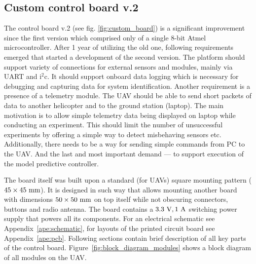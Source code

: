 \subsection{Custom control board v.2}

The control board v.2 (see fig. \ref{fig:custom_board}) is a significant improvement since the first version \citep{baca2013} which comprised only of a single 8-bit Atmel microcontroller. After 1 year of utilizing the old one, following requirements emerged that started a development of the second version. The platform should support variety of connections for external sensors and modules, mainly via UART and $\mathrm{i}^2\mathrm{c}$. It should support onboard data logging which is necessary for debugging and capturing data for system identification. Another requirement is a presence of a telemetry module. The UAV should be able to send short packets of data to another helicopter and to the ground station (laptop). The main motivation is to allow simple telemetry data being displayed on laptop while conducting an experiment. This should limit the number of unsuccessful experiments by offering a simple way to detect misbehaving sensors etc. Additionally, there needs to be a way for sending simple commands from PC to the UAV. And the last and most important demand --- to support execution of the model predictive controller.

The board itself was built upon a standard (for UAVs) square mounting pattern ($45\times 45~\mathrm{mm}$). It is designed in such way that allows mounting another board with dimensions $50\times 50~\mathrm{mm}$ on top itself while not obscuring connectors, buttons and radio antenna. The board contains a $3.3~\mathrm{V}, 1~\mathrm{A}$ switching power supply that powers all its components. For an electrical schematic see Appendix~\ref{ape:schematic}, for layouts of the printed circuit board see Appendix~\ref{ape:pcb}. Following sections contain brief description of all key parts of the control board. Figure~\ref{fig:block_diagram_modules} shows a block diagram of all modules on the UAV.

